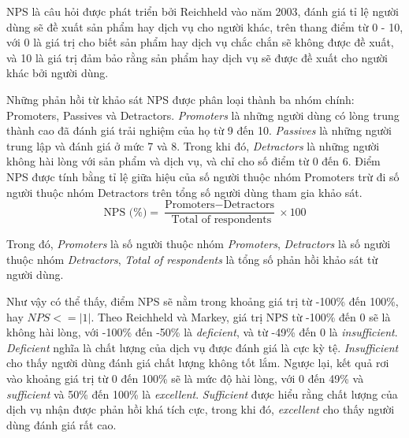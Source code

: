 NPS là câu hỏi được phát triển bởi Reichheld vào năm 2003, đánh giá tỉ lệ người dùng sẽ đề xuất sản phẩm hay dịch vụ cho người khác, trên thang điểm từ 0 - 10, với 0 là giá trị cho biết sản phẩm hay dịch vụ chắc chắn sẽ không được đề xuất, và 10 là giá trị đảm bảo rằng sản phẩm hay dịch vụ sẽ được đề xuất cho người khác bởi người dùng.
\par
Những phản hồi từ khảo sát NPS được phân loại thành ba nhóm chính: Promoters, Passives và Detractors. \emph{Promoters} là những người dùng có lòng trung thành cao đã đánh giá trải nghiệm của họ từ 9 đến 10. \emph{Passives} là những người trung lập và đánh giá ở mức 7 và 8. Trong khi đó, \emph{Detractors} là những người không hài lòng với sản phẩm và dịch vụ, và chỉ cho số điểm từ 0 đến 6. Điểm NPS được tính bằng tỉ lệ giữa hiệu của số người thuộc nhóm Promoters trừ đi số người thuộc nhóm Detractors trên tổng số người dùng tham gia khảo sát.
\[ \text{NPS (\%)} = \frac{\text{Promoters} - \text{Detractors}}{\text{ Total of respondents}} \times 100 \]
\par
Trong đó, \emph{Promoters} là số người thuộc nhóm \emph{Promoters}, \emph{Detractors} là số người thuộc nhóm \emph{Detractors}, \emph{Total of respondents} là tổng số phản hồi khảo sát từ người dùng.
\par
Như vậy có thể thấy, điểm NPS sẽ nằm trong khoảng giá trị từ -100\% đến 100\%, hay $NPS <= |1|$. Theo Reichheld và Markey, giá trị NPS từ -100\% đến 0 sẽ là không hài lòng, với -100\% đến -50\% là \emph{deficient}, và từ -49\% đến 0 là \emph{insufficient}. \emph{Deficient} nghĩa là chất lượng của dịch vụ được đánh giá là cực kỳ tệ. \emph{Insufficient} cho thấy người dùng đánh giá chất lượng không tốt lắm. Ngược lại, kết quả rơi vào khoảng giá trị từ 0 đến 100\% sẽ là mức độ hài lòng, với 0 đến 49\% và \emph{sufficient} và 50\% đến 100\% là \emph{excellent}. \emph{Sufficient} được hiểu rằng chất lượng của dịch vụ nhận được phản hồi khá tích cực, trong khi đó, \emph{excellent} cho thấy người dùng đánh giá rất cao.


